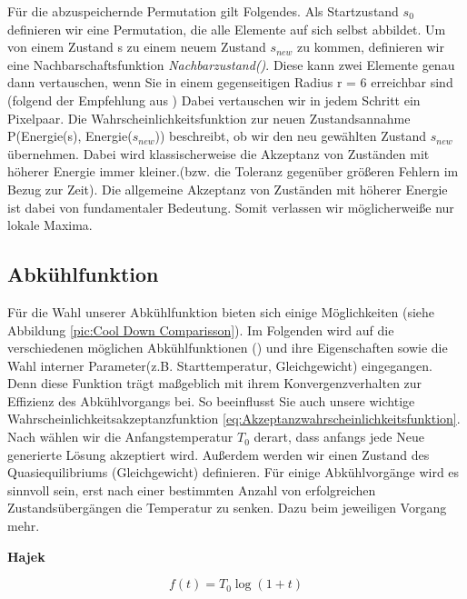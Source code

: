 Für die abzuspeichernde Permutation gilt Folgendes. Als Startzustand $s_{0}$ definieren wir eine Permutation, die alle Elemente auf sich selbst abbildet.
Um von einem Zustand s zu einem neuem Zustand $s_{new}$ zu kommen, definieren wir eine Nachbarschaftsfunktion \textit{Nachbarzustand()}. 
Diese kann zwei Elemente genau dann vertauschen, wenn Sie in einem gegenseitigen Radius r = 6 erreichbar sind (folgend der Empfehlung aus \cite[S.7]{hal02158423})
Dabei vertauschen wir in jedem Schritt ein Pixelpaar. Die Wahrscheinlichkeitsfunktion zur neuen Zustandsannahme P(Energie(s), Energie($s_{new}$)) beschreibt, ob wir den neu
gewählten Zustand $s_{new}$ übernehmen. Dabei wird klassischerweise die Akzeptanz von Zuständen mit höherer Energie immer kleiner.(bzw. die 
Toleranz gegenüber größeren Fehlern im Bezug zur Zeit). Die allgemeine Akzeptanz von Zuständen mit höherer Energie ist dabei von fundamentaler Bedeutung.
Somit verlassen wir möglicherweiße nur lokale Maxima.

\subsection{Abkühlfunktion}
\label{subsec:Abkühlfunktion}

Für die Wahl unserer Abkühlfunktion bieten sich einige Möglichkeiten (siehe Abbildung \ref{pic:Cool Down Comparisson}). Im Folgenden wird auf die verschiedenen möglichen Abkühlfunktionen 
(\cite{ScienceDirectCoolingSchedule}) und ihre Eigenschaften sowie die Wahl interner Parameter(z.B. Starttemperatur, Gleichgewicht) eingegangen. Denn diese Funktion
trägt maßgeblich mit ihrem Konvergenzverhalten zur Effizienz des Abkühlvorgangs bei. So beeinflusst Sie auch unsere wichtige Wahrscheinlichkeitsakzeptanzfunktion \ref{eq:Akzeptanzwahrscheinlichkeitsfunktion}.
Nach \cite{Kirkpatrick671} wählen wir die Anfangstemperatur $T_0$ derart, dass anfangs jede Neue generierte Lösung akzeptiert wird. Außerdem werden wir einen Zustand des Quasiequilibriums (Gleichgewicht) definieren.
Für einige Abkühlvorgänge wird es sinnvoll sein, erst nach einer bestimmten Anzahl von erfolgreichen Zustandsübergängen die Temperatur zu senken. Dazu beim jeweiligen Vorgang mehr.

\textbf{Hajek}
\begin{tcolorbox}[rightrule=3mm, rounded corners=east]
    \begin{equation}\label{eq:Hajek}
        f(t) = T_0\log(1+t)
    \end{equation}
\end{tcolorbox}

